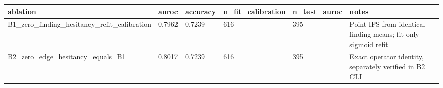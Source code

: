 \begin{tabular}{llllll}
\hline
ablation & auroc & accuracy & n\_fit\_calibration & n\_test\_auroc & notes \\
\hline
B1\_zero\_finding\_hesitancy\_refit\_calibration & 0.7962 & 0.7239 & 616 & 395 & Point IFS from identical finding means; fit-only sigmoid refit \\
B2\_zero\_edge\_hesitancy\_equals\_B1 & 0.8017 & 0.7239 & 616 & 395 & Exact operator identity, separately verified in B2 CLI \\
\hline
\end{tabular}
